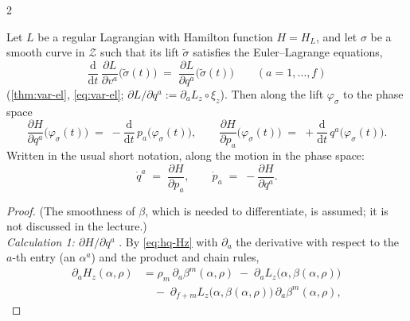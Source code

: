 \begin{paracol}{2}
\begin{theorem}\label{thm:hq-hamilton}
Let $L$ be a regular Lagrangian with Hamilton function $H=H_L$, and let $\sigma$ be a smooth curve in $\mathcal Z$ such that its lift $\tilde\sigma$ satisfies the Euler--Lagrange equations,
\begin{equation}\label{eq:hq-EL}
  \frac{\mathrm d}{\mathrm dt}\,\frac{\partial L}{\partial v^a}\bigl(\tilde\sigma(t)\bigr)\;=\;\frac{\partial L}{\partial q^a}\bigl(\tilde\sigma(t)\bigr)\qquad(a=1,\dots,f)
\end{equation}
(\cref{thm:var-el}, \eqref{eq:var-el}; $\partial L/\partial q^a:=\partial_aL_z\circ\xi_z$). Then along the lift $\varphi_\sigma$ to the phase space
\begin{equation}\label{eq:hq-hamilton}
  \frac{\partial H}{\partial q^a}\bigl(\varphi_\sigma(t)\bigr)\;=\;-\frac{\mathrm d}{\mathrm dt}\,p_a\bigl(\varphi_\sigma(t)\bigr),\qquad
  \frac{\partial H}{\partial p_a}\bigl(\varphi_\sigma(t)\bigr)\;=\;+\frac{\mathrm d}{\mathrm dt}\,q^a\bigl(\varphi_\sigma(t)\bigr).
\end{equation}
Written in the usual short notation, along the motion in the phase space:
\begin{equation}\label{eq:hq-hamilton-short}
  \dot q^a\;=\;\frac{\partial H}{\partial p_a},\qquad\dot p_a\;=\;-\frac{\partial H}{\partial q^a}.
\end{equation}
\end{theorem}
\begin{proof}
(The smoothness of $\beta$, which is needed to differentiate, is assumed; it is not discussed in the lecture.)\\
\emph{Calculation 1: $\partial H/\partial q^a$} . By \eqref{eq:hq-Hz} with $\partial_a$ the derivative with respect to the $a$-th entry (an $\alpha^a$) and the product and chain rules,
\[
  \begin{aligned}
  \partial_aH_z(\alpha,\rho)&=\rho_m\,\partial_a\beta^m(\alpha,\rho)\;-\;\partial_aL_z\bigl(\alpha,\beta(\alpha,\rho)\bigr)\\
  &\quad-\;\partial_{f+m}L_z\bigl(\alpha,\beta(\alpha,\rho)\bigr)\,\partial_a\beta^m(\alpha,\rho),
  \end{aligned}
\]

\end{proof}
\end{paracol}
